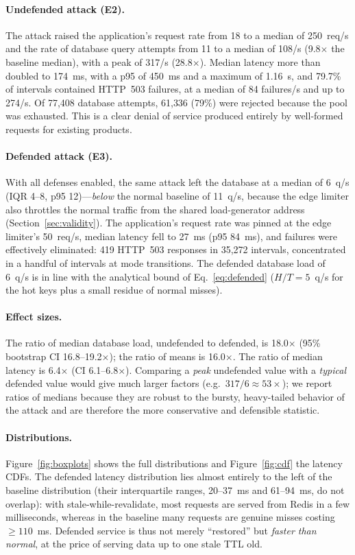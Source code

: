 \paragraph{Undefended attack (E2).} The attack raised the application's request rate
from 18 to a median of 250~req/s and the rate of database query attempts from 11 to a
median of 108/s (9.8$\times$ the baseline median), with a peak of 317/s (28.8$\times$).
Median latency more than doubled to 174~ms, with a p95 of 450~ms and a maximum of
1.16~s, and 79.7\% of intervals contained HTTP~503 failures, at a median of 84
failures/s and up to 274/s. Of 77{,}408 database attempts, 61{,}336 (79\%) were
rejected because the pool was exhausted. This is a clear denial of service produced
entirely by well-formed requests for existing products.

\paragraph{Defended attack (E3).} With all defenses enabled, the same attack left the
database at a median of 6~q/s (IQR 4--8, p95 12)---\emph{below} the normal baseline of
11~q/s, because the edge limiter also throttles the normal traffic from the shared
load-generator address (Section~\ref{sec:validity}). The application's request rate
was pinned at the edge limiter's 50~req/s, median latency fell to 27~ms (p95 84~ms),
and failures were effectively eliminated: 419 HTTP~503 responses in 35{,}272 intervals,
concentrated in a handful of intervals at mode transitions. The defended database load
of 6~q/s is in line with the analytical bound of Eq.~\eqref{eq:defended}
($H/T=5$~q/s for the hot keys plus a small residue of normal misses).

\paragraph{Effect sizes.} The ratio of median database load, undefended to defended,
is 18.0$\times$ (95\% bootstrap CI 16.8--19.2$\times$); the ratio of means is
16.0$\times$. The ratio of median latency is 6.4$\times$ (CI 6.1--6.8$\times$).
Comparing a \emph{peak} undefended value with a \emph{typical} defended value would
give much larger factors (e.g.\ $317/6\approx53\times$); we report ratios of medians
because they are robust to the bursty, heavy-tailed behavior of the attack and are
therefore the more conservative and defensible statistic.

\paragraph{Distributions.} Figure~\ref{fig:boxplots} shows the full distributions and
Figure~\ref{fig:cdf} the latency CDFs. The defended latency distribution lies almost
entirely to the left of the baseline distribution (their interquartile ranges, 20--37~ms
and 61--94~ms, do not overlap): with stale-while-revalidate, most requests are
served from Redis in a few milliseconds, whereas in the baseline many requests are
genuine misses costing ${\geq}110$~ms. Defended service is thus not merely ``restored''
but \emph{faster than normal}, at the price of serving data up to one stale TTL old.

